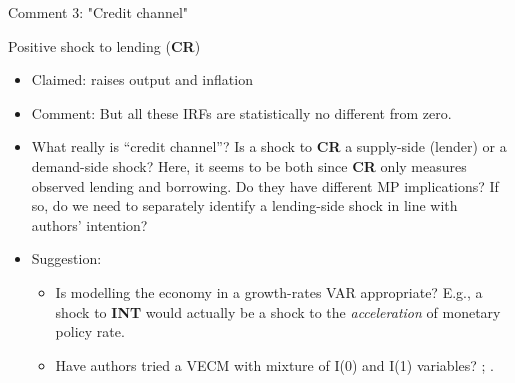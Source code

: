 \documentclass[10pt,english,slidetop,compress,
              blue,mathserif,color=option]{beamer}
\theoremstyle{plain}
\theoremstyle{definition}
\begin{document}
\begin{frame}{Comment 3: "Credit channel"}

  Positive shock to lending (\textbf{CR})
    \begin{itemize}
        \item Claimed: raises output and inflation
        \item Comment: But all these IRFs are statistically no different from zero.
        \item What really is ``credit channel''? Is a shock to \textbf{CR} a supply-side (lender) or a demand-side shock? Here, it seems to be both since \textbf{CR} only measures observed lending and borrowing. Do they have different MP implications? If so, do we need to separately identify a lending-side shock in line with authors' intention?
        \item Suggestion: 
        \begin{itemize}
          \item Is modelling the economy in a growth-rates VAR appropriate? E.g., a shock to \textbf{INT} would actually be a shock to the \emph{acceleration} of monetary policy rate. 
          \item Have authors tried a VECM with mixture of I(0) and I(1) variables? \citet{phillips1995}; \citet{chang-phillips1995}.
        \end{itemize}
    \end{itemize}  
\end{frame}
\end{document}
